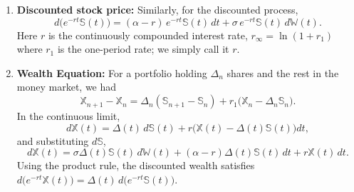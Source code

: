 \begin{enumerate}
    \item \textbf{Discounted stock price:} Similarly, for the discounted process,
    \[d\bigl(e^{-rt}\mathbb{S}(t)\bigr) = (\alpha - r)\, e^{-rt}\mathbb{S}(t)\, dt + \sigma\, e^{-rt}\mathbb{S}(t)\, d\mathbb{W}(t).\]
    Here $r$ is the continuously compounded interest rate, $r_\infty = \ln(1 + r_1)$ where $r_1$ is the one-period rate; we simply call it $r$.

    \item \textbf{Wealth Equation:} For a portfolio holding $\Delta_n$ shares and the rest in the money market, we had
    \[\mathbb{X}_{n+1} - \mathbb{X}_n = \Delta_n(\mathbb{S}_{n+1} - \mathbb{S}_n) + r_1\bigl(\mathbb{X}_n - \Delta_n \mathbb{S}_n\bigr).\]
    In the continuous limit,
    \[d\mathbb{X}(t) = \Delta(t)\, d\mathbb{S}(t) + r\bigl(\mathbb{X}(t) - \Delta(t)\mathbb{S}(t)\bigr)dt,\]
    and substituting $d\mathbb{S}$,
    \[d\mathbb{X}(t) = \sigma \Delta(t)\mathbb{S}(t)\, d\mathbb{W}(t) + (\alpha - r)\Delta(t)\mathbb{S}(t)\, dt + r\mathbb{X}(t)\, dt.\]
    Using the product rule, the discounted wealth satisfies $d\bigl(e^{-rt}\mathbb{X}(t)\bigr) = \Delta(t)\, d\bigl(e^{-rt}\mathbb{S}(t)\bigr)$.


\end{enumerate}
